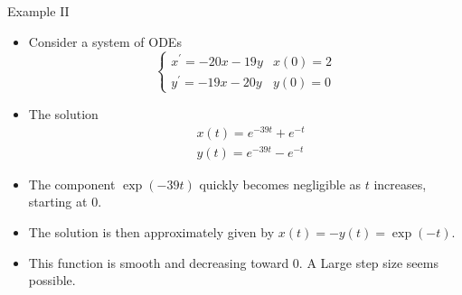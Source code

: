 \documentclass{beamer}
\begin{document}
\begin{frame}{Example II}
    \begin{itemize}
        \item Consider a system of ODEs
        $$
\begin{cases}x^{\prime}=-20 x-19 y & x(0)=2 \\ y^{\prime}=-19 x-20 y & y(0)=0\end{cases}
$$
\item The solution
$$
\begin{aligned}
& x(t)=e^{-39 t}+e^{-t} \\
& y(t)=e^{-39 t}-e^{-t}
\end{aligned}
$$
\item The component $\exp(-39t)$ quickly becomes negligible as $t$ increases, starting at 0. 
\item The solution is then approximately given by $x(t)= -y(t)= \exp(-t)$.
\item This function is smooth and decreasing toward 0. A Large step size seems possible.
    \end{itemize}
\end{frame}
\end{document}
